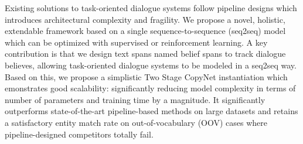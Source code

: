 Existing solutions to task-oriented dialogue systems follow pipeline designs which introduces architectural complexity and fragility. We propose a novel, holistic, extendable framework based on a single sequence-to-sequence (seq2seq) model which can be optimized with supervised or reinforcement learning. A key contribution is that we design text spans named belief spans to track dialogue believes, allowing task-oriented dialogue systems to be modeled in a seq2seq way. Based on this, we propose a simplistic Two Stage CopyNet instantiation which emonstrates good scalability: significantly reducing model complexity in terms of number of parameters and training time by a magnitude.  It significantly outperforms state-of-the-art pipeline-based methods on large datasets and retains a satisfactory entity match rate on out-of-vocabulary (OOV) cases where pipeline-designed competitors totally fail.
